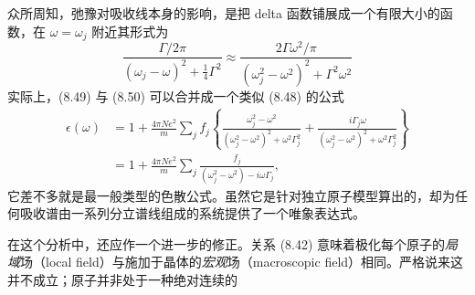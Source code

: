 众所周知，弛豫对吸收线本身的影响，是把 delta 函数铺展成一个有限大小的函数，在 $\omega = \omega_j$ 附近其形式为
\begin{equation*}
\frac{\Gamma/2\pi}{(\omega_j-\omega)^2+\frac{1}{4}\Gamma^2} \approx \frac{2\Gamma\omega^2/\pi}{(\omega_j^2-\omega^2)^2+\Gamma^2\omega^2}\tag{8.50}
\end{equation*}
实际上，(8.49) 与 (8.50) 可以合并成一个类似 (8.48) 的公式
\begin{align*}
\epsilon(\omega) &= 1 + \frac{4\pi N e^2}{m}\sum_j f_j\left\{\frac{\omega_j^2-\omega^2}{(\omega_j^2-\omega^2)^2+\omega^2\Gamma_j^2} + \frac{i\Gamma_j\omega}{(\omega_j^2-\omega^2)^2+\omega^2\Gamma_j^2}\right\}\\
&= 1 + \frac{4\pi N e^2}{m}\sum_j \frac{f_j}{(\omega_j^2-\omega^2)-i\omega\Gamma_j},\tag{8.51}
\end{align*}
它差不多就是最一般类型的色散公式。虽然它是针对独立原子模型算出的，却为任何吸收谱由一系列分立谱线组成的系统提供了一个唯象表达式。

在这个分析中，还应作一个进一步的修正。关系 (8.42) 意味着极化每个原子的\emph{局域}场（local field）与施加于晶体的\emph{宏观}场（macroscopic field）相同。严格说来这并不成立；原子并非处于一种绝对连续的
